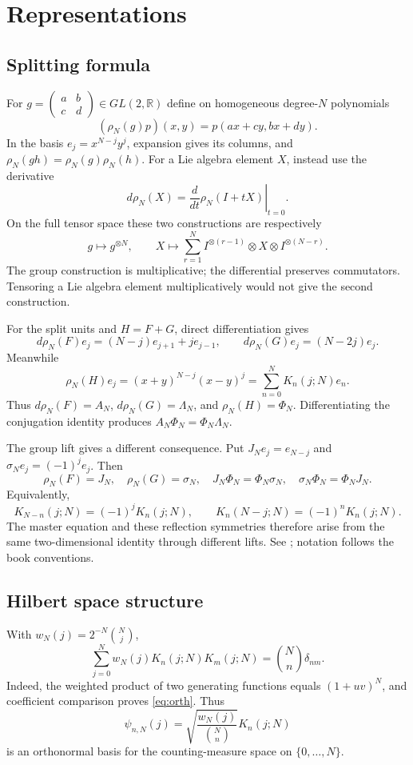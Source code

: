 \chapter{Representations}
\label{ch:8}
\section{Splitting formula}
\label{sec:8-1}
For $g=\begin{pmatrix}a&b\\c&d\end{pmatrix}\in GL(2,\mathbb R)$ define
on homogeneous degree-$N$ polynomials
\[
(\rho_N(g)p)(x,y)=p(ax+cy,bx+dy).
\]
In the basis $e_j=x^{N-j}y^j$, expansion gives its columns, and
$\rho_N(gh)=\rho_N(g)\rho_N(h)$.
For a Lie algebra element $X$, instead use the derivative
\[
d\rho_N(X)=\left.\frac{d}{dt}\rho_N(I+tX)\right|_{t=0}.
\]
On the full tensor space these two constructions are respectively
\[
g\mapsto g^{\otimes N},\qquad
X\mapsto\sum_{r=1}^N I^{\otimes(r-1)}\otimes X\otimes I^{\otimes(N-r)}.
\]
The group construction is multiplicative; the differential preserves
commutators. Tensoring a Lie algebra element multiplicatively would
not give the second construction.

For the split units and $H=F+G$, direct differentiation gives
\[
d\rho_N(F)e_j=(N-j)e_{j+1}+je_{j-1},\qquad
d\rho_N(G)e_j=(N-2j)e_j.
\]
Meanwhile
\[
\rho_N(H)e_j=(x+y)^{N-j}(x-y)^j
=\sum_{n=0}^N K_n(j;N)e_n.
\]
Thus $d\rho_N(F)=A_N$, $d\rho_N(G)=\Lambda_N$, and
$\rho_N(H)=\Phi_N$. Differentiating the conjugation identity produces
$A_N\Phi_N=\Phi_N\Lambda_N$.

The group lift gives a different consequence. Put
$J_Ne_j=e_{N-j}$ and $\sigma_Ne_j=(-1)^je_j$. Then
\[
\rho_N(F)=J_N,\quad\rho_N(G)=\sigma_N,\quad
J_N\Phi_N=\Phi_N\sigma_N,\quad \sigma_N\Phi_N=\Phi_NJ_N.
\]
Equivalently,
\[
K_{N-n}(j;N)=(-1)^jK_n(j;N),\qquad
K_n(N-j;N)=(-1)^nK_n(j;N).
\]
The master equation and these reflection symmetries therefore arise
from the same two-dimensional identity through different lifts.
See \cite[Section~7]{KocikFeynman}; notation follows the book conventions.

\section{Hilbert space structure}
\label{sec:8-2}
With $w_N(j)=2^{-N}\binom Nj$,
\begin{equation}\label{eq:orth}
\sum_{j=0}^Nw_N(j)K_n(j;N)K_m(j;N)=\binom Nn\delta_{nm}.
\end{equation}
Indeed, the weighted product of two generating functions equals $(1+uv)^N$, and coefficient comparison proves \eqref{eq:orth}. Thus
\[
\psi_{n,N}(j)=\sqrt{\frac{w_N(j)}{\binom Nn}}K_n(j;N)
\]
is an orthonormal basis for the counting-measure space on $\{0,\ldots,N\}$.


